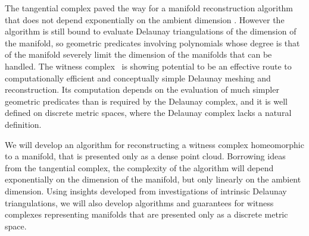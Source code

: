 The tangential complex paved the way for a
manifold reconstruction algorithm that does not depend exponentially
on the ambient dimension \cite{geometrica-7142i}. However the algorithm is still bound to
evaluate Delaunay triangulations of the dimension of the manifold, so
geometric predicates involving polynomials whose degree is that of the
manifold severely limit the dimension of the manifolds that can be
handled.
%
The witness complex~\cite{deSilva2008} is showing potential to be an
effective route to computationally efficient and conceptually simple
Delaunay meshing and reconstruction. Its computation depends on the
evaluation of much simpler geometric predicates than is required by
the Delaunay complex, and it is well defined on discrete metric
spaces, where the Delaunay complex lacks a natural definition. 
%

We will develop an algorithm for reconstructing a witness complex
homeomorphic to a manifold, that is presented only as a dense point
cloud. %
Borrowing ideas from the tangential complex, the complexity of the
algorithm will depend exponentially on the dimension of the
manifold, but only linearly on the ambient dimension. Using insights
developed from investigations of intrinsic Delaunay triangulations, we
will also develop algorithms and guarantees for witness complexes
representing manifolds that are presented only as a discrete metric
space.

